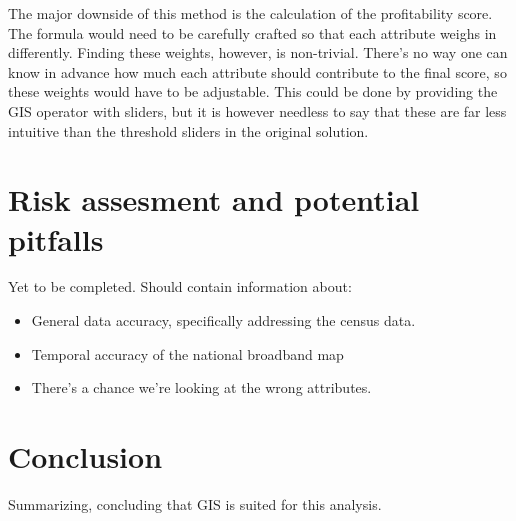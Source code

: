 \documentclass[twocolumn]{article}
\begin{document}
The major downside of this method is the calculation of the profitability score. The formula would need to be carefully crafted so that each attribute weighs in differently. Finding these weights, however, is non-trivial. There's no way one can know in advance how much each attribute should contribute to the final score, so these weights would have to be adjustable. This could be done by providing the GIS operator with sliders, but it is however needless to say that these are far less intuitive than the threshold sliders in the original solution.


\section{Risk assesment and potential pitfalls}
\label{sec:Risk assesment and potential pitfalls}
Yet to be completed. Should contain information about:
\begin{itemize}
  \item General data accuracy, specifically addressing the census data.
  \item Temporal accuracy of the national broadband map
  \item There's a chance we're looking at the wrong attributes.
\end{itemize}

\section{Conclusion}
\label{sec:Conclusion}
Summarizing, concluding that GIS is suited for this analysis.


\printbibliography
\end{document}
